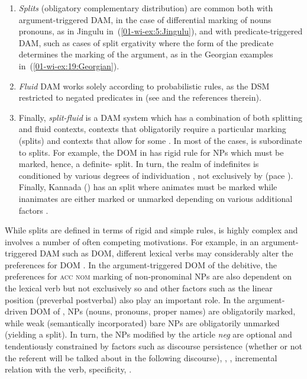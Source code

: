 \documentclass[output=paper]{LSP/langsci}
\begin{document}
\renewcommand{\labelenumi}{\roman{enumi}}
\begin{enumerate}
\item \textit{Splits} (obligatory complementary distribution) are common both with argu\-ment-triggered DAM, \eg in the case of differential marking of nouns \vs pronouns, as in Jingulu in~(\ref{01-wi-ex:5:Jingulu}), and with predicate-triggered DAM, such as cases of split ergativity where the form of the predicate determines the marking of the argument, as in the Georgian examples in~(\ref{01-wi-ex:19:Georgian}).
\item \textit{Fluid} DAM works solely according to probabilistic rules, as \eg the DSM restricted to negated predicates in  (see \eg \citealt[300--311]{Timberlake2004Reference} and the references therein).
\item Finally, \textit{split-fluid} is a DAM system which has a combination of both splitting and fluid contexts, \ie contexts that obligatorily require a particular marking (splits) and contexts that allow for some . 
In most of the cases,  is subordinate to splits. 
For example, the DOM in  has rigid rule for  NPs which must be marked, hence, a definite- split. 
In turn, the realm of indefinites is conditioned by various degrees of individuation \citep[183--185]{Lazard1992Grammar}, not exclusively by  (pace \citealt[107--113]{Dalrympleetal2011Objects}). 
Finally, Kannada () has an  \vs {} split where animates must be marked while inanimates are either marked or unmarked depending on various additional factors \citep{Lidz2006Grammar}.
\end{enumerate}

\noindent While splits are defined in terms of rigid and simple rules,  is highly complex and involves a number of often competing motivations. 
For example, in an argument-triggered DAM such as  DOM, different lexical verbs may considerably alter the preferences for DOM \citep{vonHeusingeretal2007Differential}. 
In the argument-triggered DOM of the  debitive, the preferences for \textsc{acc} \vs \textsc{nom} marking of non-pronominal NPs are also dependent on the lexical verb but not exclusively so and other factors such as the linear position (preverbal \vs postverbal) also play an important role. 
In the argument-driven DOM of ,  NPs (nouns, pronouns, proper names) are obligatorily marked, while weak  (semantically incorporated) bare NPs are obligatorily unmarked (yielding a split). 
In turn, the  NPs modified by the  article \textit{neg} are optional and tendentiously constrained by factors such as discourse persistence (whether or not the referent will be talked about in the following discourse), , , incremental relation with the verb, specificity, \etc \citep[67]{Guntsetseg2008Differential}. 
\end{document}
